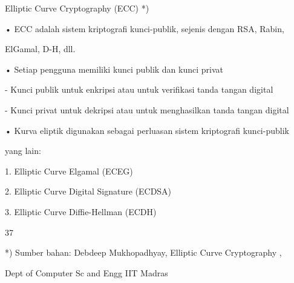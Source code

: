 \documentclass{article}
\begin{document}

Elliptic Curve Cryptography (ECC) *)

• ECC adalah sistem kriptografi kunci-publik, sejenis dengan RSA, Rabin, 

ElGamal, D-H, dll.

• Setiap pengguna memiliki kunci publik dan kunci privat

     -  Kunci publik untuk enkripsi atau untuk verifikasi tanda  tangan digital

     -  Kunci privat untuk dekripsi atau untuk menghasilkan tanda tangan digital

• Kurva eliptik digunakan sebagai perluasan sistem kriptografi kunci-publik 

yang  lain:


1. Elliptic Curve Elgamal (ECEG)


2. Elliptic Curve Digital Signature (ECDSA)


3. Elliptic Curve Diffie-Hellman (ECDH)

37

*) Sumber bahan: Debdeep Mukhopadhyay, Elliptic Curve Cryptography ,

 Dept of Computer Sc and Engg IIT Madras
\end{document}

